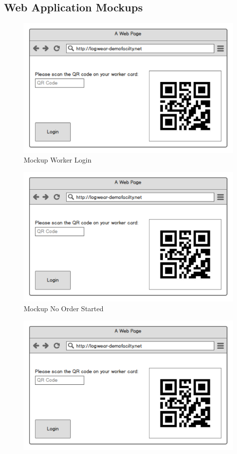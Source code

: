 \begin{appendices}
\section{Web Application Mockups}\label{sec:webappmockups}
\begin{figure}[htbp]
	\includegraphics[width=\textwidth, page=1]{images/WebAppMockups}
	\caption{Mockup Worker Login}
\end{figure}
\begin{figure}
	\includegraphics[width=\textwidth, page=2]{images/WebAppMockups}
	\caption{Mockup No Order Started}
\end{figure}
\begin{figure}
	\includegraphics[width=\textwidth, page=3]{images/WebAppMockups}

\end{figure}
\end{appendices}
